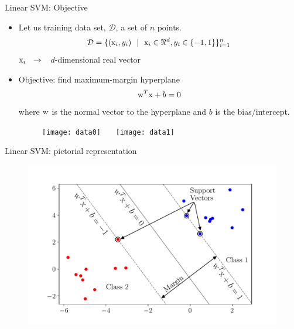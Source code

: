 \begin{frame}{Linear SVM: Objective}
\begin{itemize}
\item Let us training data set, $\mathcal{D}$, a set of $n$ points.
\[\mathcal{D}=\{({\rm x}_i,y_i)~~|~~{\rm x}_i\in \Re ^d, y_i\in \{-1,1\}\}^n_{i=1}\]
${\rm x}_i~~\rightarrow$~~$d$-dimensional real vector
\item {\rm Objective}: find maximum-margin hyperplane 
\[{\rm w}^T{\rm x}+b=0\]
where ${\rm w}$ is the normal vector to the hyperplane and $b$ is the bias/intercept.
\begin{figure}
\texttt{[image: data0]}~~~
\texttt{[image: data1]}
\end{figure}
\end{itemize}
\end{frame}


\begin{frame}{Linear SVM: pictorial representation}
\begin{figure}
\includegraphics[scale=0.55]{Figures/data5}
\end{figure}
\end{frame}

